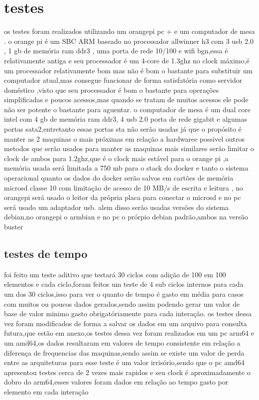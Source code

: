 \documentclass[
	12pt,				%
	openright,			%
	oneside,			%
	a4paper,			%
	english,			%
	french,				%
	spanish,			%
	brazil,				%
	]{abntex2}
\begin{document}
\chapter{testes}
\label{ch: testes}
os testes foram realizados utilizando um orangepi pc + e um computador de mesa .
o orange pi é um SBC ARM baseado no processador allwinner h3 com 3 usb 2.0 , 1 gb de memória ram ddr3 , uma porta de rede 10/100 e wifi bgn,essa é relativamente antiga e seu processador é um 4-core de 1.3ghz no clock máximo,é um processador relativamente bom mas não é bom o bastante para substituir um computador atual,mas consegue funcionar de forma satisfatória como servidor doméstico ,visto que seu processador é bom o bastante para operações simplificadas e poucos acessos,mas quando se tratam de muitos acessos ele pode não ser potente o bastante para aguentar.
o computador de mesa é um dual core intel com 4 gb de memória ram ddr3, 4 usb 2.0 porta de rede gigabit e algumas portas sata2,entretanto essas portas sta não serão usadas já que o propósito é manter as 2 maquinas o mais próximas em relação a hardwaree possivel
outros metodos que serão usados para manter as maquinas mais similares serão limitar o clock de ambos para 1.2ghz,que é o clock mais estável para o orange pi ,a memória usada será limitada a 750 mb para o stack do docker e tanto o sistema operacional quanto os dados do docker serão salvos em cartões de memória microsd classe 10 com limitação de acesso de 10 MB/s de escrita e leitura , no orangepi será usado o leitor da própria placa para conectar o microsd e no pc será usado um adaptador usb.
alem disso serão usadas versões do sistema debian,no orangepi o armbian e no pc o prórpio debian padrão,ambos na versão buster

\section{testes de tempo}
\label{sec:testes de tempo}

foi feito um teste aditivo que testará 30 ciclos com adição de 100 em 100 elementos e cada ciclo,foram feitos um teste de 4 sub ciclos internos para cada um dos 30 ciclos,isso para ver o quanto de tempo é gasto em média para casos com muitos ou poucos dados gerados,sendo assim podendo gerar um valor de base de valor minimo gasto obrigatóriamente para cada interação.\newline
os testes dessa vez foram modificados de forma a salvar os dados em um arquivo para consulta futura,que estão em anexo,os testes dessa vez foram realizados em um pc arm64 e um amd64,os dados resultaram em valores de tempo consistente em relação a diferença de frequencias das maquinas,sendo assim se existe um valor de perda entre as arquiteturas para esse teste é um valor irrisório,sendo que o pc amd64 apresentou testes cerca de 2 vezes mais rapidos e seu clock é aproximadamente o dobro do arm64,esses valores foram dados em relação ao tempo gasto por elemento em cada interação
\end{document}
